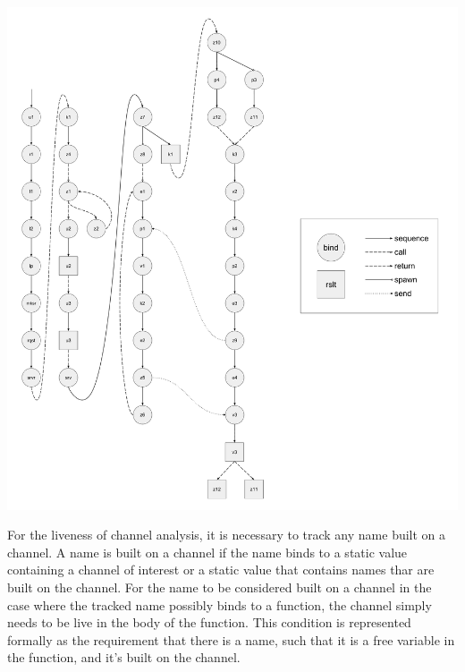 \documentclass[letterpaper, 11pt]{extarticle}
\begin{document}
\includegraphics[width=1\textwidth]{cml-graph-lp.pdf}

For the liveness of channel analysis, it is necessary to track any name built on a channel.
A name is built on a channel if the name binds to a static value 
containing a channel of interest or a static value that contains names thar are built on the channel.
For the name to be considered built on a channel in the case where the tracked name possibly binds to a function,
the channel simply needs to be live in the body of the function.
This condition is represented formally as the requirement that there is a 
name, such that it is a free variable in the function, and it's built on the channel.
\end{document}
